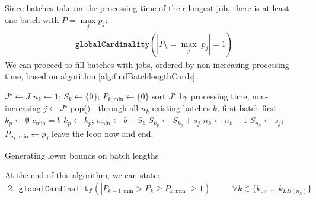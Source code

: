 Since batches take on the processing time of their longest job, there is at
least one batch with $P = \underset{j}{\max} p_j $: \begin{align}
\mathtt{globalCardinality}( |P_k = \underset{j}{\max} \; p_j| = 1 ) \end{align}
We can proceed to fill batches with jobs, ordered by non-increasing processing
time, based on algorithm \ref{alg:findBatchlengthCards}. 

\begin{algorithm}[h!]
\fontsize{9pt}{11.5pt}\selectfont \begin{algorithmic} \State $J^{\star} \gets J$
 \State $n_k \gets 1$; $S_k
\gets \{0\}$; $P_{k,\text{min}} \gets \{0\}$  \State sort $J^{\star}$ by processing time, non-increasing
\Repeat \State $j \gets J^{\star}$.pop()  \Loop $\;$ through all $n_k$ existing batches $k$, first
batch first \State $k_p \gets \emptyset$  \State
$c_\text{min} = b$   \State $k_p \gets k_p$; $c_\text{min} \gets
b-S_k$ \EndIf \EndLoop {} \State $S_{k_p} \gets S_{k_p} + s_j$
 \Else {} \State $n_k
\gets n_k + 1$ \State $S_{n_k} \gets s_j$;
$P_{n_k,\text{min}} \gets p_j$ 
\Else \State leave the loop now and end.  \EndIf \EndIf {} \end{algorithmic} \caption{Generating lower bounds on batch lengths}
\label{alg:findBatchlengthCards} \end{algorithm}
At the end of this algorithm, we can state: \begin{alignat}{2} &
\mathtt{globalCardinality}( |P_{k-1,\text{min}} > P_k \geq P_{k,\text{min}} |
\geq 1) \quad && \forall k \in \{k_0,\dots,k_{LB(n_k)}\} \end{alignat}

